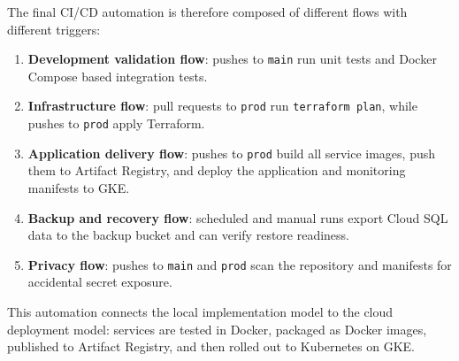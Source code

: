 The final CI/CD automation is therefore composed of different flows with different triggers:

\begin{enumerate}
    \item \textbf{Development validation flow}: pushes to \texttt{main} run unit tests and Docker Compose based integration tests.
    \item \textbf{Infrastructure flow}: pull requests to \texttt{prod} run \texttt{terraform plan}, while pushes to \texttt{prod} apply Terraform.
    \item \textbf{Application delivery flow}: pushes to \texttt{prod} build all service images, push them to Artifact Registry, and deploy the application and monitoring manifests to GKE.
    \item \textbf{Backup and recovery flow}: scheduled and manual runs export Cloud SQL data to the backup bucket and can verify restore readiness.
    \item \textbf{Privacy flow}: pushes to \texttt{main} and \texttt{prod} scan the repository and manifests for accidental secret exposure.
\end{enumerate}

This automation connects the local implementation model to the cloud deployment model: services are tested in Docker, packaged as Docker images, published to Artifact Registry, and then rolled out to Kubernetes on GKE.
